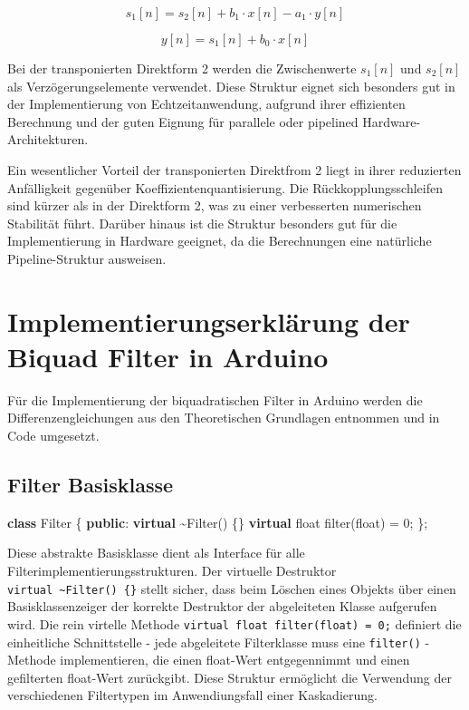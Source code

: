 \documentclass[
  ngerman,
  letterpaper,
  DIV=11]{scrreprt}
\newenvironment{Shaded}{\begin{snugshade}}{\end{snugshade}}
\newcommand{\DataTypeTok}[1]{\textcolor[rgb]{0.68,0.00,0.00}{#1}}
\newcommand{\DecValTok}[1]{\textcolor[rgb]{0.68,0.00,0.00}{#1}}
\newcommand{\KeywordTok}[1]{\textcolor[rgb]{0.00,0.23,0.31}{\textbf{#1}}}
\newcommand{\NormalTok}[1]{\textcolor[rgb]{0.00,0.23,0.31}{#1}}
\newcommand{\OperatorTok}[1]{\textcolor[rgb]{0.37,0.37,0.37}{#1}}
\begin{document}
\[
s_1[n] =  s_2[n] + b_1 \cdot x[n] - a_1 \cdot y[n]
\]

\[
y[n] = s_1[n] + b_0 \cdot x[n]
\]

Bei der transponierten Direktform 2 werden die Zwischenwerte \(s_1[n]\)
und \(s_2[n]\) als Verzögerungselemente verwendet. Diese Struktur eignet
sich besonders gut in der Implementierung von Echtzeitanwendung,
aufgrund ihrer effizienten Berechnung und der guten Eignung für
parallele oder pipelined Hardware-Architekturen.

Ein wesentlicher Vorteil der transponierten Direktfrom 2 liegt in ihrer
reduzierten Anfälligkeit gegenüber Koeffizientenquantisierung. Die
Rückkopplungsschleifen sind kürzer als in der Direktform 2, was zu einer
verbesserten numerischen Stabilität führt. Darüber hinaus ist die
Struktur besonders gut für die Implementierung in Hardware geeignet, da
die Berechnungen eine natürliche Pipeline-Struktur ausweisen.

\chapter{Implementierungserklärung der Biquad Filter in
Arduino}\label{implementierungserkluxe4rung-der-biquad-filter-in-arduino}

Für die Implementierung der biquadratischen Filter in Arduino werden die
Differenzengleichungen aus den Theoretischen Grundlagen entnommen und in
Code umgesetzt.

\section{Filter Basisklasse}\label{filter-basisklasse}

\begin{Shaded}
\begin{Highlighting}[]
\KeywordTok{class}\NormalTok{ Filter}
  \OperatorTok{\{}
  \KeywordTok{public}\OperatorTok{:}
    \KeywordTok{virtual} \OperatorTok{\textasciitilde{}}\NormalTok{Filter}\OperatorTok{()} \OperatorTok{\{\}}
    \KeywordTok{virtual} \DataTypeTok{float}\NormalTok{ filter}\OperatorTok{(}\DataTypeTok{float}\OperatorTok{)} \OperatorTok{=} \DecValTok{0}\OperatorTok{;}
  \OperatorTok{\};}
\end{Highlighting}
\end{Shaded}

Diese abstrakte Basisklasse dient als Interface für alle
Filterimplementierungsstrukturen. Der virtuelle Destruktor
\texttt{virtual\ \textasciitilde{}Filter()\ \{\}} stellt sicher, dass
beim Löschen eines Objekts über einen Basisklassenzeiger der korrekte
Destruktor der abgeleiteten Klasse aufgerufen wird. Die rein virtelle
Methode \texttt{virtual\ float\ filter(float)\ =\ 0;} definiert die
einheitliche Schnittstelle - jede abgeleitete Filterklasse muss eine
\texttt{filter()} - Methode implementieren, die einen float-Wert
entgegennimmt und einen gefilterten float-Wert zurückgibt. Diese
Struktur ermöglicht die Verwendung der verschiedenen Filtertypen im
Anwendiungsfall einer Kaskadierung.
\end{document}
